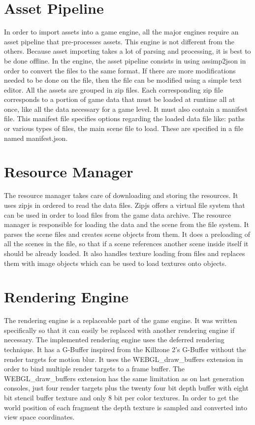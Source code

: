 \section{Asset Pipeline}

In order to import assets into a game engine, all the major engines require an asset pipeline that pre-processes assets. This engine is not different from the others. Because asset importing takes a lot of parsing and processing, it is best to be done offline. In the engine, the asset pipeline consists in using assimp2json in order to convert the files to the same format. If there are more modifications needed to be done on the file, then the file can be modified using a simple text editor. All the assets are grouped in zip files. Each corresponding zip file corresponds to a portion of game data that must be loaded at runtime all at once, like all the data necessary for a game level. It must also contain a manifest file. This manifest file specifies options regarding the loaded data file like: paths or various types of files, the main scene file to load. These are specified in a file named manifest.json.

\section{Resource Manager}

The resource manager takes care of downloading and storing the resources. It uses zipjs in ordered to read the data files. Zipjs offers a virtual file system that can be used in order to load files from the game data archive.
The resource manager is responsible for loading the data and the scene from the file system. It parses the scene files and creates scene objects from them. It does a preloading of all the scenes in the file, so that if a scene references another scene inside itself it should be already loaded. It also handles texture loading from files and replaces them with image objects which can be used to load textures onto objects.

\section{Rendering Engine}

The rendering engine is a replaceable part of the game engine. It was written specifically so that it can easily be replaced with another rendering engine if necessary.
The implemented rendering engine uses the deferred rendering technique. It has a G-Buffer inspired from the Killzone 2’s G-Buffer without the render targets for motion blur.
It uses the WEBGL\_draw\_buffers extension in order to bind multiple render targets to a frame buffer. The WEBGL\_draw\_buffers extension has the same limitation as on last generation consoles, just four render targets plus the twenty four bit depth buffer with eight bit stencil buffer texture and only 8 bit per color textures.
In order to get the world position of each fragment the depth texture is sampled and converted into view space coordinates.

